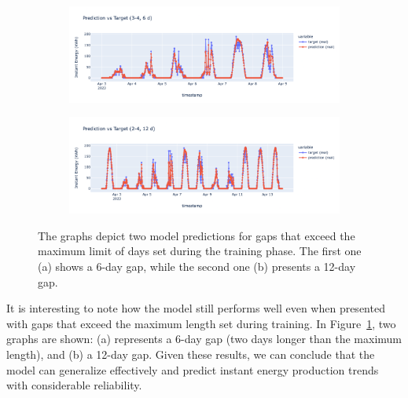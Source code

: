 \begin{figure}[H]
	\centering
	\begin{subfigure}{\textwidth}
		\centering
		\includegraphics[width=.9\textwidth]{chapters/3_models/imgs/grrun/eval/grruneval6buco.png}
		\caption{}
	\end{subfigure}
	\begin{subfigure}{\textwidth}
		\centering
		\includegraphics[width=.9\textwidth]{chapters/3_models/imgs/grrun/eval/grruneval12buco.png}
		\caption{}
	\end{subfigure}
	\caption{The graphs depict two model predictions for gaps that exceed the maximum limit of days set during the training phase. The first one (a) shows a 6-day gap, while the second one (b) presents a 12-day gap.}
	\label{fig:grrunevalbucogrande}
\end{figure}

It is interesting to note how the model still performs well even
when presented with gaps that exceed the maximum length set
during training.
In Figure~\ref{fig:grrunevalbucogrande}, two graphs are shown:
(a) represents a 6-day gap (two days longer than the maximum length),
and (b) a 12-day gap.
Given these results, we can conclude that the model can
generalize effectively and predict instant energy production
trends with considerable reliability.



